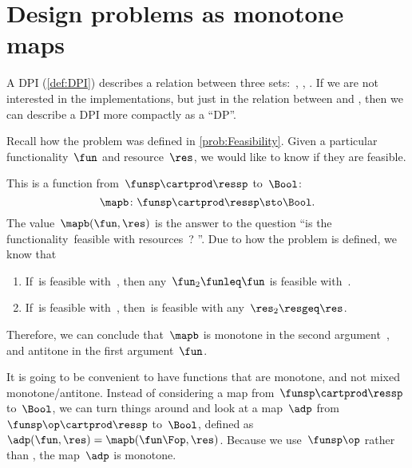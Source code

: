 
\section[DPs as monotone maps]{Design problems as monotone maps}
\label{sec:dpdefinition}


A DPI (\cref{def:DPI}) describes a relation between three sets:~\funsp, \ressp, \impsp.
If we are not interested in the implementations, but just in the relation between \funsp and \ressp, then we can describe a DPI more compactly as a ``DP''\@.

Recall how the problem \Feasibility was defined in \cref{prob:Feasibility}.
Given a particular functionality~$\fun$ and resource~$\res$, we would like to know if they are feasible.

This is a function from~$\funsp \cartprod \ressp$ to~$\Bool$:
% 
\begin{equation}
    \mapb\colon \funsp \cartprod \ressp \sto \Bool.
\end{equation}
%
The value~$\mapb(\fun, \res)$ is the answer to the question ``is the functionality~\fun feasible with resources~\res?
''.
Due to how the problem is defined, we know that%
\begin{enumerate}
    \item If~\fun is feasible with~\res, then any~$\fun_2 \funleq \fun$ is feasible with~\res.
    \item If~\fun is feasible with~\res, then~\fun is feasible with any~$\res_2 \resgeq \res$.
\end{enumerate}
Therefore, we can conclude that~$\mapb$ is monotone in the second argument~\res, and antitone in the first argument~$\fun$.

It is going to be convenient to have functions that are monotone, and not mixed monotone/antitone.
Instead of considering a map from~$\funsp \cartprod \ressp$ to~$\Bool$, we can turn things around and look at a map~$\adp$ from~$\funsp\op \cartprod \ressp$ to~$\Bool$, defined as~$\adp(\fun,\res) = \mapb(\fun\Fop,\res)$.
Because we use~$\funsp\op$ rather than \funsp, the map~$\adp$ is monotone.


